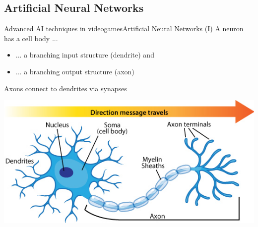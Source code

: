 \documentclass[10pt,compress]{beamer} %
\begin{document}
\subsection{Artificial Neural Networks}
\begin{frame}{Advanced AI techniques in videogames}{Artificial Neural Networks (I)} 
	A neuron has a cell body ...
	\begin{itemize}
	\item ... a branching input structure (dendrite) and 
	\item ... a branching output structure (axon)
	\end{itemize}
	Axons connect to dendrites via synapses
	\smallskip
	\begin{center}
	\includegraphics[width=0.6\linewidth]{figs/neuron_anatomy.jpg}
	\end{center}
\end{frame}
\end{document}
